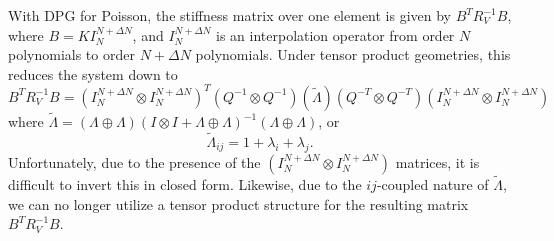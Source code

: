 \documentclass{article}
\begin{document}
With DPG for Poisson, the stiffness matrix over one element is given by $B^TR_V^{-1}B$, where $B = KI_N^{N+\Delta N}$, and $I_N^{N+\Delta N}$ is an interpolation operator from order $N$ polynomials to order ${N+\Delta N}$ polynomials.  Under tensor product geometries, this reduces the system down to 
\[
B^TR_V^{-1}B = (I_N^{N+\Delta N}\otimes I_N^{N+\Delta N})^T (Q^{-1}\otimes Q^{-1}) (\tilde{\Lambda}) (Q^{-T}\otimes Q^{-T})(I_N^{N+\Delta N}\otimes I_N^{N+\Delta N})
\]
where $\tilde{\Lambda} = (\Lambda\oplus \Lambda) (I \otimes I + \Lambda \oplus \Lambda)^{-1}(\Lambda\oplus \Lambda)$, or
\[
\tilde{\Lambda}_{ij} = 1 + \lambda_i + \lambda_j.
\]
Unfortunately, due to the presence of the $(I_N^{N+\Delta N}\otimes I_N^{N+\Delta N})$ matrices, it is difficult to invert this in closed form.  Likewise, due to the $ij$-coupled nature of $\tilde{\Lambda}$, we can no longer utilize a tensor product structure for the resulting matrix $B^TR_V^{-1}B$.  
\end{document}
